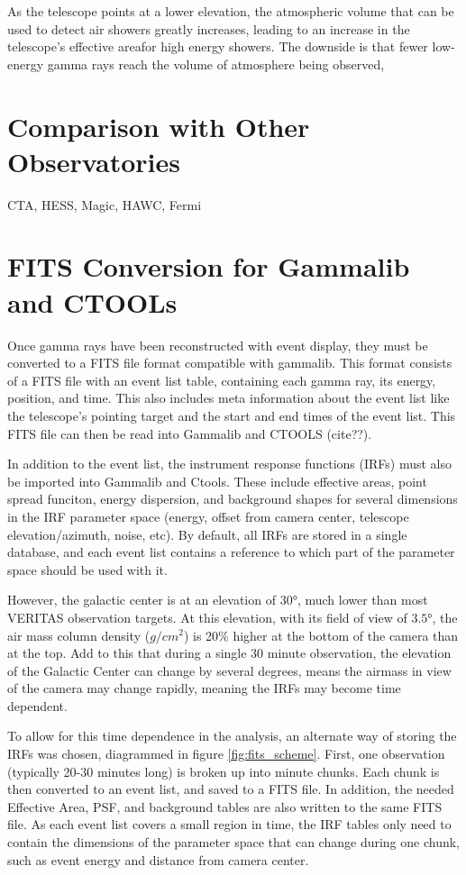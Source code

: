 As the telescope points at a lower elevation, the atmospheric volume that can be used to detect air showers greatly increases, leading to an increase in the telescope's effective areafor high energy showers.
The downside is that fewer low-energy gamma rays reach the volume of atmosphere being observed, 


\section{Comparison with Other Observatories}


CTA, HESS, Magic, HAWC, Fermi

\section{FITS Conversion for Gammalib and CTOOLs}

Once gamma rays have been reconstructed with event display, they must be converted to a FITS file format compatible with gammalib.
This format consists of a FITS file with an event list table, containing each gamma ray, its energy, position, and time.
This also includes meta information about the event list like the telescope's pointing target and the start and end times of the event list.
This FITS file can then be read into Gammalib and CTOOLS (cite??).

In addition to the event list, the instrument response functions (IRFs) must also be imported into Gammalib and Ctools.
These include effective areas, point spread funciton, energy dispersion, and background shapes for several dimensions in the IRF parameter space (energy, offset from camera center, telescope elevation/azimuth, noise, etc).
By default, all IRFs are stored in a single database, and each event list contains a reference to which part of the parameter space should be used with it.

However, the galactic center is at an elevation of $\ang{30}$, much lower than most VERITAS observation targets.
At this elevation, with its field of view of $\ang{3.5}$, the air mass column density ($g/cm^{2}$) is 20\% higher at the bottom of the camera than at the top.
Add to this that during a single 30 minute observation, the elevation of the Galactic Center can change by several degrees, means the airmass in view of the camera may change rapidly, meaning the IRFs may become time dependent.

To allow for this time dependence in the analysis, an alternate way of storing the IRFs was chosen, diagrammed in figure \ref{fig:fits_scheme}.
First, one observation (typically 20-30 minutes long) is broken up into  minute chunks.
Each chunk is then converted to an event list, and saved to a FITS file.
In addition, the needed Effective Area, PSF, and background tables are also written to the same FITS file.
As each event list covers a small region in time, the IRF tables only need to contain the dimensions of the parameter space that can change during one chunk, such as event energy and distance from camera center.

